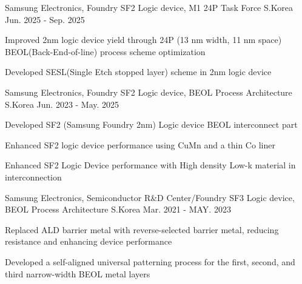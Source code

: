 

\begin{cventries}

  \cventry
    {Samsung Electronics, Foundry} %
    {SF2 Logic device, M1 24P Task Force} %
    {S.Korea} %
    {Jun. 2025 - Sep. 2025} %
    {
      \begin{cvitems} %
        \item {Improved 2nm logic device yield through 24P (13 nm width, 11 nm space) BEOL(Back-End-of-line) process scheme optimization}
        \item {Developed SESL(Single Etch stopped layer) scheme in 2nm logic device}
      \end{cvitems}
    }

  \cventry
    {Samsung Electronics, Foundry} %
    {SF2 Logic device, BEOL Process Architecture} %
    {S.Korea} %
    {Jun. 2023 - May. 2025} %
    {
      \begin{cvitems} %
        \item {Developed SF2 (Samsung Foundry 2nm) Logic device BEOL interconnect part}
        \item {Enhanced SF2 logic device performance using CuMn and a thin Co liner}
        \item {Enhanced SF2 Logic Device performance with High density Low-k material in interconnection}
      \end{cvitems}
    }

  \cventry
    {Samsung Electronics, Semiconductor R\&D Center/Foundry} %
    {SF3 Logic device, BEOL Process Architecture} %
    {S.Korea} %
    {Mar. 2021 - MAY. 2023} %
    {
      \begin{cvitems} %
        \item {Replaced ALD barrier metal with reverse-selected barrier metal, reducing resistance and enhancing device performance}
        \item {Developed a self-aligned universal patterning process for the first, second, and third narrow-width BEOL metal layers}
      \end{cvitems}
    }


\end{cventries}
